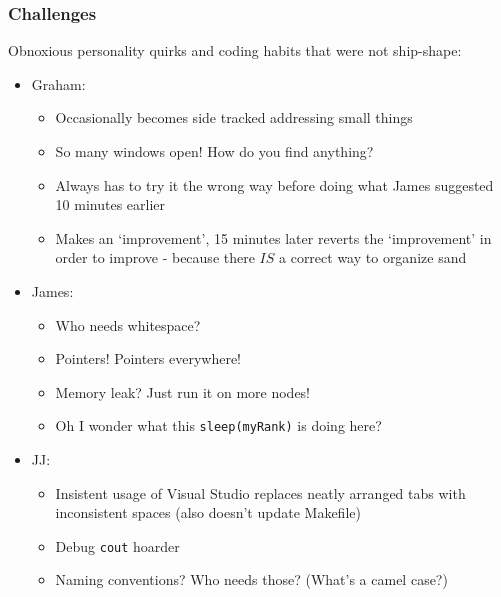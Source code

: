 \documentclass[usernames,dvipsnames]{beamer}
\begin{document}
\begin{frame}	
	\frametitle{Challenges}
	
	\begin{alertblock}{\small Obnoxious personality quirks and coding habits that were not ship-shape:}
		\begin{itemize}
			\small
			\setlength\itemsep{0.1pt}
			\item Graham: \\ \vspace{-5pt}
				\begin{itemize}
					\small
					\setlength\itemsep{0.1pt}
					\item Occasionally becomes side tracked addressing small things
					\item So many windows open! How do you find anything?
					\item Always has to try it the wrong way before doing what James suggested 10 minutes earlier \vspace{-5pt}
					\item Makes an `improvement', 15 minutes later reverts the `improvement' in order to improve - because there $IS$ a correct way to organize sand
				\end{itemize}
			\item James: \\ \vspace{-5pt}
				\begin{itemize}
					\small
					\setlength\itemsep{0.1pt}
					\item Who needs whitespace?
					\item Pointers! Pointers everywhere!
					\item Memory leak? Just run it on more nodes! \vspace{-5pt}
					\item Oh I wonder what this \texttt{sleep(myRank)} is doing here?
				\end{itemize}
			\item JJ: \\ \vspace{-5pt}
				\begin{itemize}
					\small
					\setlength\itemsep{0.1pt}
					\item Insistent usage of Visual Studio replaces neatly arranged tabs with inconsistent spaces (also doesn't update Makefile)
					\item Debug \texttt{cout} hoarder
					\item Naming conventions? Who needs those? (What's a camel case?)
				\end{itemize}
		\end{itemize}
	\end{alertblock}

\end{frame}
\end{document}
